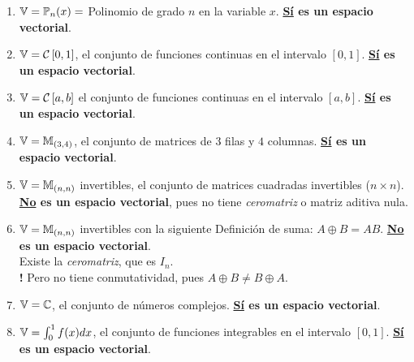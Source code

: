\begin{enumerate}
    \item $\mathbb{V} = \mathbb{P}_n(x) =$ Polinomio de grado $n$ en la variable $x$. \textbf{\underline{Sí} es un espacio vectorial}.

    \item $\mathbb{V} = \mathcal{C}\left[ 0, 1 \right]$, el conjunto de funciones continuas en el intervalo $[0, 1]$. \textbf{\underline{Sí} es un espacio vectorial}.
    
    \item $\mathbb{V} = \mathcal{C}\left[ a, b \right]$ el conjunto de funciones continuas en el intervalo $[a, b]$. \textbf{\underline{Sí} es un espacio vectorial}.
    
    \item $\mathbb{V} = \mathbb{M}_{(3, 4)}$, el conjunto de matrices de $3$ filas y $4$ columnas. \textbf{\underline{Sí} es un espacio vectorial}.
    
    \item $\mathbb{V} = \mathbb{M}_{(n, n)}$ invertibles, el conjunto de matrices cuadradas invertibles ($n \times n$). \textbf{\underline{No} es un espacio vectorial}, pues no tiene \textit{ceromatriz} o matriz aditiva nula.
    
    \item $\mathbb{V} = \mathbb{M}_{(n, n)}$ invertibles con la siguiente Definición de suma: $A \oplus B = AB$. \textbf{\underline{No} es un espacio vectorial}. \\
        \checkmark Existe la \textit{ceromatriz}, que es $I_n$. \\
        \textbf{!} Pero no tiene conmutatividad, pues $A \oplus B \neq B \oplus A$.

    \item $\mathbb{V} = \mathbb{C}$, el conjunto de números complejos. \textbf{\underline{Sí} es un espacio vectorial}.
    
    \item $\mathbb{V} = \int_{0}^{1} f(x) dx$, el conjunto de funciones integrables en el intervalo $[0, 1]$. \textbf{\underline{Sí} es un espacio vectorial}. 
\end{enumerate}

